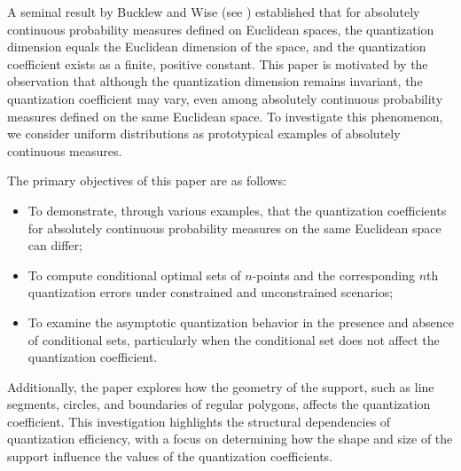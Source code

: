 \documentclass[12pt, reqno]{amsart}
\theoremstyle{plain}
\theoremstyle{definition}
\begin{document}
A seminal result by Bucklew and Wise (see \cite{BW}) established that for absolutely continuous probability measures defined on Euclidean spaces, the quantization dimension equals the Euclidean dimension of the space, and the quantization coefficient exists as a finite, positive constant.
This paper is motivated by the observation that although the quantization dimension remains invariant, the quantization coefficient may vary, even among absolutely continuous probability measures defined on the same Euclidean space. To investigate this phenomenon, we consider uniform distributions as prototypical examples of absolutely continuous measures.

The primary objectives of this paper are as follows:
\begin{itemize}
    \item To demonstrate, through various examples, that the quantization coefficients for absolutely continuous probability measures on the same Euclidean space can differ;
    \item To compute conditional optimal sets of $n$-points and the corresponding $n$th quantization errors under constrained and unconstrained scenarios;
    \item To examine the asymptotic quantization behavior in the presence and absence of conditional sets, particularly when the conditional set does not affect the quantization coefficient.
\end{itemize}

Additionally, the paper explores how the geometry of the support, such as line segments, circles, and boundaries of regular polygons, affects the quantization coefficient. This investigation highlights the structural dependencies of quantization efficiency, with a focus on determining how the shape and size of the support influence the values of the quantization coefficients.
 
\end{document}
